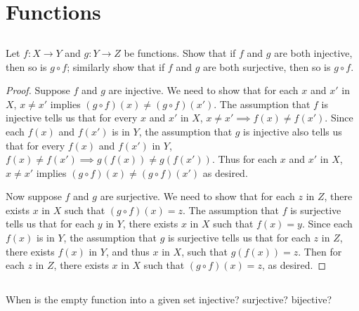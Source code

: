 \documentclass[../../main.tex]{subfiles}
\begin{document}
\ifmainfile
\else
    \ifchapfile
    \else
        \addtocounter{chapter}{3}
        \addtocounter{section}{2}
        \makeatletter
        \begin{flushright}
            \@title \\
            \@author \\
            \@date
        \end{flushright}
    \fi
\fi

\section{Functions}
\subsection{}
\begin{q}
    Let $f : X \to Y$ and $g : Y \to Z$ be functions. Show that if $f$ and $g$ are both injective, then so is $g \circ f$; similarly show that if $f$ and $g$ are both surjective, then so is $g \circ f$.
\end{q}


\begin{proof}
    Suppose $f$ and $g$ are injective.
    We need to show that for each $x$ and $x'$ in $X$, $x \neq x'$ implies $(g \circ f)(x) \neq (g \circ f)(x')$.
    The assumption that $f$ is injective tells us that for every $x$ and $x'$ in $X$, $x \neq x' \implies f(x) \neq f(x')$.
    Since each $f(x)$ and $f(x')$ is in $Y$, the assumption that $g$ is injective also tells us that for every $f(x)$ and $f(x')$ in $Y$, $f(x) \neq f(x') \implies g(f(x)) \neq g(f(x'))$.
    Thus for each $x$ and $x'$ in $X$, $x \neq x'$ implies $(g \circ f)(x) \neq (g \circ f)(x')$ as desired.
    
    Now suppose $f$ and $g$ are surjective.
    We need to show that for each $z$ in $Z$, there exists $x$ in $X$ such that $(g \circ f)(x)=z$.
    The assumption that $f$ is surjective tells us that for each $y$ in $Y$, there exists $x$ in $X$ such that $f(x)=y$.
    Since each $f(x)$ is in $Y$, the assumption that $g$ is surjective tells us that for each $z$ in $Z$, there exists $f(x)$ in $Y$, and thus $x$ in $X$, such that $g(f(x))=z$. Then for each $z$ in $Z$, there exists $x$ in $X$ such that $(g \circ f)(x)=z$, as desired. 
\end{proof}

\subsection{}
\begin{q}
    When is the empty function into a given set injective? surjective? bijective?
\end{q}
\end{document}
